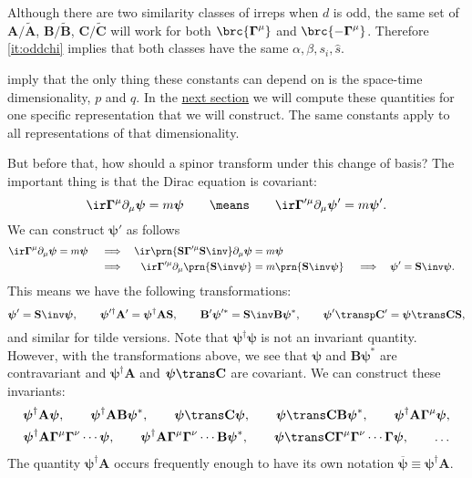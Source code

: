 \documentclass[11pt]{article}
\newcommand{\Gammab}{\boldsymbol{\Gamma}}
\renewcommand{\S}{\mathbf{S}}
\newcommand{\A}{\mathbf{A}}
\newcommand{\B}{\mathbf{B}}
\renewcommand{\C}{\mathbf{C}}
\newcommand{\At}{\widetilde{\mathbf{A}}}
\newcommand{\Bt}{\widetilde{\mathbf{B}}}
\newcommand{\Ct}{\widetilde{\mathbf{C}}}
\newcommand{\psib}{\boldsymbol{\psi}}
\begin{document}
Although there are two similarity classes of irreps when $d$ is odd, the same set of $\A/\At$, $\B/\Bt$, $\C/\Ct$ will work for both $\brc{\Gammab^\mu}$ and $\brc{ -\Gammab^\mu }$.
Therefore \cref{it:oddchi} implies that both classes have the same $\alpha, \beta, s_i, \hat{s}$.

 imply that the only thing these constants can depend on is the space-time dimensionality, $p$ and $q$.
In the \hyperref[sec:explicit]{next section} we will compute these quantities for one specific representation that we will construct.
The same constants apply to all representations of that dimensionality.

But before that, how should a spinor transform under this change of basis?
The important thing is that the Dirac equation is covariant:
%
\begin{equation*}
  \ir \Gammab^\mu \partial_\mu \psib = m \psib
  \qquad \means \qquad
  \ir \Gammab'^\mu \partial_\mu \psib' = m \psib'.
\end{equation*}
%
We can construct $\psib'$ as follows
%
\begin{equation*}
\begin{aligned}
  \ir \Gammab^\mu \partial_\mu \psib &= m \psib &
  &\implies &
  \ir \prn{\S \Gammab'^\mu \S\inv} \partial_\mu \psib &= m \psib \\ &&
  &\implies &
  \ir \Gammab'^\mu \partial_\mu \prn{\S\inv\psib} &= m \prn{\S\inv\psib} &
  &\implies &
  \psib' &= \S\inv \psib.
\end{aligned}
\end{equation*}
%
This means we have the following transformations:
%
\begin{equation}\label{eq:spinorbasis}
  \psib' = \S\inv \psib, \qquad
  \psib'^\dag \A' = \psib^\dag \A \S, \qquad
  \B' \psib'^\ast = \S\inv \B \psib^\ast, \qquad
  \psib'\transp \C' = \psib\trans \C \S,
\end{equation}
%
and similar for tilde versions.
Note that $\psib^\dag \psib$ is not an invariant quantity.
However, with the transformations above, we see that $\psib$ and $\B \psib^\ast$ are contravariant and $\psib^\dag\A$ and $\psib\trans \C$ are covariant.
We can construct these invariants:
%
\begin{equation}\label{eq:spinorinvt}
\begin{gathered}
  \psib^\dag \A \psib, \qquad
  \psib^\dag \A \B \psib^\ast, \qquad
  \psib\trans \C \psib, \qquad
  \psib\trans \C \B \psib^\ast, \qquad
  \psib^\dag \A \Gammab^\mu \psib, \\
  \psib^\dag \A \Gammab^\mu \Gammab^\nu \cdots \psib, \qquad
  \psib^\dag \A \Gammab^\mu \Gammab^\nu \cdots \B \psib^\ast, \qquad
  \psib\trans \C \Gammab^\mu \Gammab^\nu \cdots \Gammab \psib, \qquad
  \ldots
\end{gathered}
\end{equation}
%
The quantity \( \psib^\dag \A \) occurs frequently enough to have its own notation \( \overline{\psib} \equiv \psib^\dag \A \).
\end{document}
